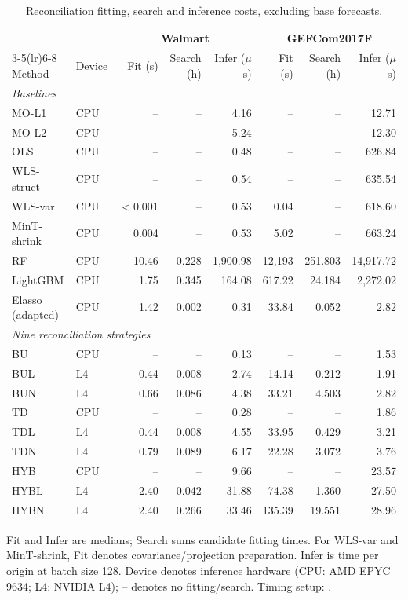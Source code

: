 \begin{table}[htbp]
\centering
\caption{Reconciliation fitting, search and inference costs, excluding base forecasts.}
\label{tab:cost}
\begingroup
\renewcommand{\baselinestretch}{1.05}\fontsize{8.5}{10}\selectfont
\setlength{\tabcolsep}{3.5pt}
\renewcommand{\arraystretch}{1.06}
\begin{tabular*}{\textwidth}{@{\extracolsep{\fill}}llrrrrrr@{}}
\toprule
 & & \multicolumn{3}{c}{Walmart} & \multicolumn{3}{c}{GEFCom2017F} \\
\cmidrule(lr){3-5}\cmidrule(lr){6-8}
Method & Device & Fit (s) & Search (h) & Infer ($\mu$s) & Fit (s) & Search (h) & Infer ($\mu$s) \\
\midrule
\multicolumn{8}{l}{\textit{Baselines}} \\
\addlinespace[2pt]
MO-L1 & CPU & -- & -- & 4.16 & -- & -- & 12.71 \\
MO-L2 & CPU & -- & -- & 5.24 & -- & -- & 12.30 \\
OLS & CPU & -- & -- & 0.48 & -- & -- & 626.84 \\
WLS-struct & CPU & -- & -- & 0.54 & -- & -- & 635.54 \\
WLS-var & CPU & $<0.001$ & -- & 0.53 & 0.04 & -- & 618.60 \\
MinT-shrink & CPU & 0.004 & -- & 0.53 & 5.02 & -- & 663.24 \\
RF & CPU & 10.46 & 0.228 & 1,900.98 & 12,193 & 251.803 & 14,917.72 \\
LightGBM & CPU & 1.75 & 0.345 & 164.08 & 617.22 & 24.184 & 2,272.02 \\
Elasso (adapted) & CPU & 1.42 & 0.002 & 0.31 & 33.84 & 0.052 & 2.82 \\
\midrule
\multicolumn{8}{l}{\textit{Nine reconciliation strategies}} \\
\addlinespace[2pt]
BU & CPU & -- & -- & 0.13 & -- & -- & 1.53 \\
BUL & L4 & 0.44 & 0.008 & 2.74 & 14.14 & 0.212 & 1.91 \\
BUN & L4 & 0.66 & 0.086 & 4.38 & 33.21 & 4.503 & 2.82 \\
TD & CPU & -- & -- & 0.28 & -- & -- & 1.86 \\
TDL & L4 & 0.44 & 0.008 & 4.55 & 33.95 & 0.429 & 3.21 \\
TDN & L4 & 0.79 & 0.089 & 6.17 & 22.28 & 3.072 & 3.76 \\
HYB & CPU & -- & -- & 9.66 & -- & -- & 23.57 \\
HYBL & L4 & 2.40 & 0.042 & 31.88 & 74.38 & 1.360 & 27.50 \\
HYBN & L4 & 2.40 & 0.266 & 33.46 & 135.39 & 19.551 & 28.96 \\
\bottomrule
\end{tabular*}
\par\smallskip\begin{minipage}{\textwidth}\footnotesize
Fit and Infer are medians; Search sums candidate fitting times. For WLS-var and MinT-shrink, Fit denotes covariance/projection preparation.
Infer is time per origin at batch size 128. Device denotes inference hardware (CPU: AMD EPYC 9634; L4: NVIDIA L4); -- denotes no fitting/search.
Timing setup: .
\end{minipage}
\endgroup
\end{table}
